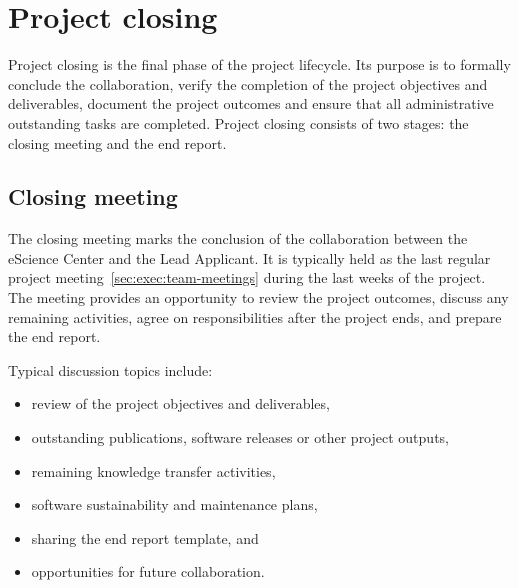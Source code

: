 \section{Project closing}
\label{sec:closing}
Project closing is the final phase of the project lifecycle. Its purpose is to formally conclude the collaboration, 
verify the completion of the project objectives and deliverables, document the project outcomes and ensure that all 
administrative outstanding tasks are completed. Project closing consists of two stages: the closing meeting and the end 
report.

\subsection{Closing meeting}
\label{sec:closing:meeting}
The closing meeting marks the conclusion of the collaboration between the eScience Center and the Lead Applicant. It is 
typically held as the last regular project meeting~\ref{sec:exec:team-meetings} during the last weeks of the project. 
The meeting provides an opportunity to review the project outcomes, discuss any remaining activities, agree on 
responsibilities after the project ends, and prepare the end report.

Typical discussion topics include:
\vspace{-0.2cm}
\begin{itemize}
 \item review of the project objectives and deliverables,
 \item outstanding publications, software releases or other project outputs,
 \item remaining knowledge transfer activities,
 \item software sustainability and maintenance plans,
 \item sharing the end report template, and
 \item opportunities for future collaboration.
\end{itemize}
\vspace{-0.2cm}

